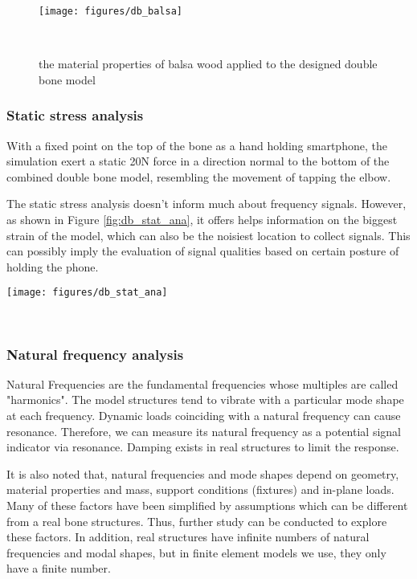 \documentclass{sigchi}
\begin{document}
\begin{figure}
\centering
  \texttt{[image: figures/db\_balsa]}
  \caption{the material properties of balsa wood applied to the designed double bone model}~\label{fig:db_balsa}
\end{figure}

\subsubsection{Static stress analysis}

With a fixed point on the top of the bone as a hand holding smartphone, the simulation exert a static 20N force in a direction normal to the bottom of the combined double bone model, resembling the movement of tapping the elbow.

The static stress analysis doesn't inform much about frequency signals. However, as shown in Figure \ref{fig:db_stat_ana}, it offers helps information on the biggest strain of the model, which can also be the noisiest location to collect signals. This can possibly imply the evaluation of signal qualities based on certain posture of holding the phone.


\begin{figure*}
\centering
  \texttt{[image: figures/db\_stat\_ana]}
  \caption{the static stress analysis of the double bone model in (a) stress, (b) displacement and (c) strain.}~\label{fig:db_stat_ana}
\end{figure*}


\subsubsection{Natural frequency analysis}

Natural Frequencies are the fundamental frequencies whose multiples are called "harmonics". The model structures tend to vibrate with a particular mode shape at each frequency. Dynamic loads coinciding with a natural frequency can cause resonance. Therefore, we can measure its natural frequency as a potential signal indicator via resonance. Damping exists in real structures to limit the response.

It is also noted that, natural frequencies and mode shapes depend on geometry, material properties and mass, support conditions (fixtures) and in-plane loads. Many of these factors have been simplified by assumptions which can be different from a real bone structures. Thus, further study can be conducted to explore these factors. In addition, real structures have infinite numbers of natural frequencies and modal shapes, but in finite element models we use, they only have a finite number.
\end{document}
